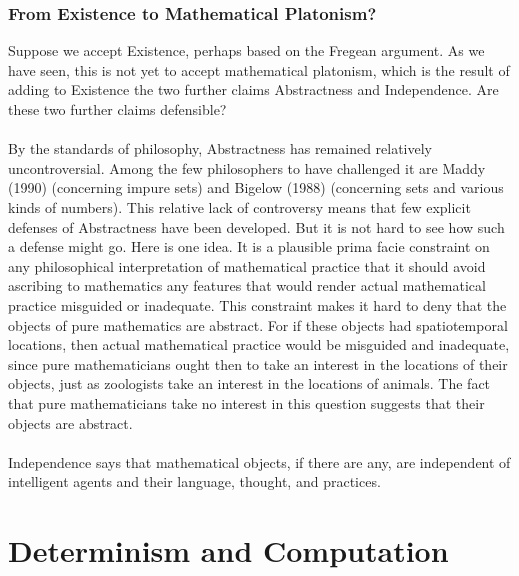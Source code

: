 \documentclass[10pt,a4paper]{article}
\begin{document}
                    \subsubsection{From Existence to Mathematical Platonism?}
                        Suppose we accept Existence, perhaps based on the Fregean argument. As we have seen, this is not yet to accept mathematical platonism, which is the result of adding to Existence the two further claims Abstractness and Independence. Are these two further claims defensible?
                        \\
                        \\
                        By the standards of philosophy, Abstractness has remained relatively uncontroversial. Among the few philosophers to have challenged it are Maddy (1990) (concerning impure sets) and Bigelow (1988) (concerning sets and various kinds of numbers). This relative lack of controversy means that few explicit defenses of Abstractness have been developed. But it is not hard to see how such a defense might go. Here is one idea. It is a plausible prima facie constraint on any philosophical interpretation of mathematical practice that it should avoid ascribing to mathematics any features that would render actual mathematical practice misguided or inadequate. This constraint makes it hard to deny that the objects of pure mathematics are abstract. For if these objects had spatiotemporal locations, then actual mathematical practice would be misguided and inadequate, since pure mathematicians ought then to take an interest in the locations of their objects, just as zoologists take an interest in the locations of animals. The fact that pure mathematicians take no interest in this question suggests that their objects are abstract.
                        \\
                        \\
                        Independence says that mathematical objects, if there are any, are independent of intelligent agents and their language, thought, and practices.
        \section{Determinism and Computation}
\end{document}
